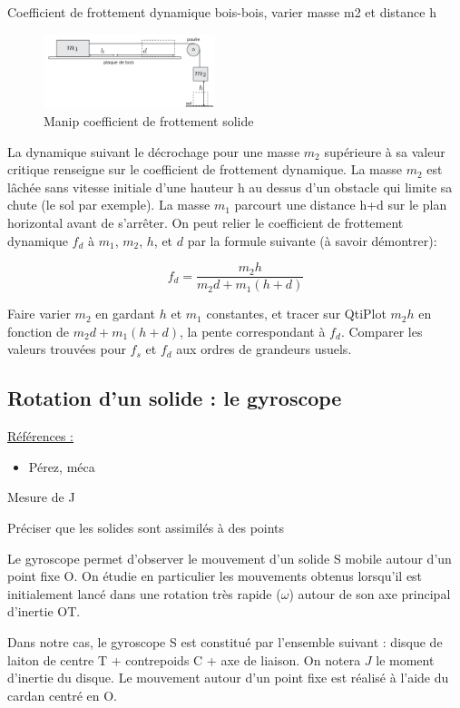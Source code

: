 \documentclass{article}%
\begin{document}
Coefficient de frottement dynamique bois-bois, varier masse m2 et distance h

\begin{figure}
      \centerline{\includegraphics[width=5cm]{images-exp/Manip_frottement_solide.png}}
 \caption{Manip coefficient de frottement solide}
\end{figure}

La dynamique suivant le décrochage pour une masse $m_2$ supérieure à sa valeur critique renseigne sur le coefficient de frottement dynamique. La masse $m_2$ est lâchée sans vitesse initiale d'une hauteur h au dessus d'un obstacle qui limite sa chute (le sol par exemple). La masse $m_1$ parcourt une distance h+d sur le plan horizontal avant de s'arrêter. On peut relier le coefficient de frottement dynamique $f_d$ à $m_1$, $m_2$, $h$, et $d$ par la formule suivante (à savoir démontrer):

\[ f_d=\frac{m_2h}{m_2d+m_1(h+d)}\]

Faire varier $m_2$ en gardant $h$ et $m_1$ constantes, et tracer sur QtiPlot $m_2h$ en fonction de $m_2d+m_1(h+d)$, la pente correspondant à $f_d$. Comparer les valeurs trouvées pour $f_s$ et $f_d$ aux ordres de grandeurs usuels. 

\subsection{Rotation d'un solide : le gyroscope}
\underline{Références :}
\begin{itemize}
	\item Pérez, méca
\end{itemize}

Mesure de J

Préciser que les solides sont assimilés à des points

Le gyroscope permet d'observer le mouvement d'un solide S mobile autour d'un point fixe O. On étudie en particulier les mouvements obtenus lorsqu'il est initialement lancé dans une rotation très rapide ($\omega$) autour de son axe principal d'inertie OT.

Dans notre cas, le gyroscope S est constitué par l'ensemble suivant : disque de laiton de centre T + contrepoids C + axe de liaison. On notera $J$ le moment d'inertie du disque. Le mouvement autour d'un point fixe est réalisé à l'aide du cardan centré en O. 
\end{document}
